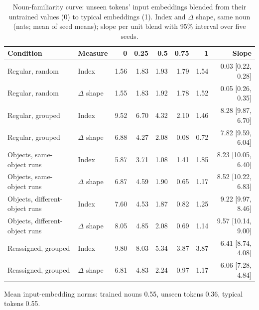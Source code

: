 \begin{table}[!htbp]
\centering\small
\caption{Noun-familiarity curve: unseen tokens' input embeddings blended from their untrained values (0) to typical embeddings (1). Index and $\Delta$ shape, same noun (nats; mean of seed means); slope per unit blend with 95\% interval over five seeds.}
\label{tab:L3}
\begin{tabular}{@{}llrrrrrr@{}}
\toprule
Condition & Measure & 0 & 0.25 & 0.5 & 0.75 & 1 & Slope \\
\midrule
Regular, random & Index & \textminus{}1.56 & \textminus{}1.83 & \textminus{}1.93 & \textminus{}1.79 & \textminus{}1.54 & 0.03 [\textminus{}0.22, 0.28] \\
Regular, random & $\Delta$ shape & \textminus{}1.55 & \textminus{}1.83 & \textminus{}1.92 & \textminus{}1.78 & \textminus{}1.52 & 0.05 [\textminus{}0.26, 0.35] \\
Regular, grouped & Index & 9.52 & 6.70 & 4.32 & 2.10 & 1.46 & \textminus{}8.28 [\textminus{}9.87, \textminus{}6.70] \\
Regular, grouped & $\Delta$ shape & 6.88 & 4.27 & 2.08 & \textminus{}0.08 & \textminus{}0.72 & \textminus{}7.82 [\textminus{}9.59, \textminus{}6.04] \\
Objects, same-object runs & Index & 5.87 & 3.71 & 1.08 & \textminus{}1.41 & \textminus{}1.85 & \textminus{}8.23 [\textminus{}10.05, \textminus{}6.40] \\
Objects, same-object runs & $\Delta$ shape & 6.87 & 4.59 & 1.90 & \textminus{}0.65 & \textminus{}1.17 & \textminus{}8.52 [\textminus{}10.22, \textminus{}6.83] \\
Objects, different-object runs & Index & 7.60 & 4.53 & 1.87 & \textminus{}0.82 & \textminus{}1.25 & \textminus{}9.22 [\textminus{}9.97, \textminus{}8.46] \\
Objects, different-object runs & $\Delta$ shape & 8.05 & 4.85 & 2.08 & \textminus{}0.69 & \textminus{}1.14 & \textminus{}9.57 [\textminus{}10.14, \textminus{}9.00] \\
Reassigned, grouped & Index & 9.80 & 8.03 & 5.34 & 3.87 & 3.87 & \textminus{}6.41 [\textminus{}8.74, \textminus{}4.08] \\
Reassigned, grouped & $\Delta$ shape & 6.81 & 4.83 & 2.24 & 0.97 & 1.17 & \textminus{}6.06 [\textminus{}7.28, \textminus{}4.84] \\
\bottomrule
\end{tabular}
\end{table}

Mean input-embedding norms: trained nouns 0.55, unseen tokens 0.36, typical tokens 0.55.
